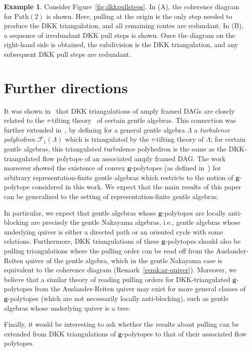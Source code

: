 \documentclass[12pt]{amsart}
\theoremstyle{definition}
\newtheorem{example}[theorem]{Example}
\newcommand\bg{\mathbf{g}}
\newcommand\calF{\mathcal{F}}
\newcommand\Path{\mathrm{Path}}
\begin{document}
\begin{example}
    \label{ex:pathpulling}
    Consider Figure~\ref{fig:dkkpullsteps}.
    In (A), the coherence diagram for $\Path(2)$ is shown.
    Here, pulling at the origin is the only step needed to produce the DKK triangulation, and all remaining routes are redundant.
    In (B), a sequence of irredundant DKK pull steps is shown.
    Once the diagram on the right-hand side is obtained, the subdivision is the DKK triangulation, and any subsequent DKK pull steps are redundant.
\end{example}

\section{Further directions}\label{sec:furtherdirections}

It was shown in~\cite{Polytopes2} that DKK triangulations of amply framed DAGs are closely related to the $\tau$-tilting theory~\cite{AIR} of certain gentle algebras. This connection was further extended in~\cite{Berggren}, by defining for a general gentle algebra $\Lambda$ a \emph{turbulence polyhedron} $\calF_1(\Lambda)$ which is triangulated by the $\tau$-tilting theory of $\Lambda$; for certain gentle algebras, this triangulated turbulence polyhedron is the same as the DKK-triangulated flow polytope of an associated amply framed DAG. The work~\cite{Berggren} moreover showed the existence of convex $\bg$-polytopes (as defined in~\cite{AHIKM}) for arbitrary representation-finite gentle algebras which restricts to the notion of $\bg$-polytope considered in this work. We expect that the main results of this paper can be generalized to the setting of representation-finite gentle algebras.

In particular, we expect that gentle algebras whose $\bg$-polytopes are locally anti-blocking are precisely the gentle Nakayama algebras, i.e., gentle algebras whose underlying quiver is either a directed path or an oriented cycle with some relations.
Furthermore, DKK triangulations of these $\bg$-polytopes should also be pulling triangulations where the pulling order can be read off from the Auslander-Reiten quiver of the gentle algebra, which in the gentle Nakayama case is equivalent to the coherence diagram (Remark~\ref{remk:ar-quiver}). Moreover, we believe that a similar theory of reading pulling orders for DKK-triangulated $\bg$-polytopes from the Auslander-Reiten quiver may exist for more general classes of $\bg$-polytopes (which are not necessarily locally anti-blocking), such as gentle algebras whose underlying quiver is a tree.

Finally, it would be interesting to ask whether the results about pulling can be extended from DKK triangulations of $\bg$-polytopes to that of their associated flow polytopes.    



\end{document}
